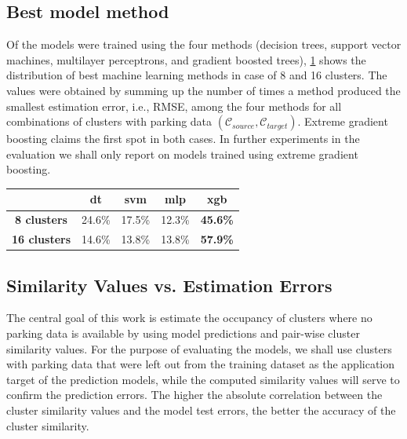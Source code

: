 	\subsection{Best model method}
	\label{sec:bestmodel}
	Of the models were trained using the four methods (decision trees, support vector machines, multilayer perceptrons, and gradient boosted trees), \cref{evaluation:best_model_method} shows the distribution of best machine learning methods in case of 8 and 16 clusters. The values were obtained by summing up the number of times a method produced the smallest estimation error, i.e., RMSE, among the four methods for all combinations of clusters with parking data $(\mathcal{C}_{source}, \mathcal{C}_{target})$.
	Extreme gradient boosting claims the first spot in both cases.
	In further experiments in the evaluation we shall only report on models trained using extreme gradient boosting.
	
	\begin{table}[!ht]
		{\begin{tabular}{ | c | c | c | c | c |}
				\hline
				& \textbf{dt} & \textbf{svm} & \textbf{mlp} & \textbf{xgb} \\ \hline
				\textbf{8 clusters} & 24.6\% & 17.5\% & 12.3\% & \textbf{45.6\%} \\ \hline
				\textbf{16 clusters} & 14.6\% & 13.8\% & 13.8\% & \textbf{57.9\%} \\ \hline
			\end{tabular}}
			\label{evaluation:best_model_method}
	\end{table}
		
	\subsection{Similarity Values vs. Estimation Errors}
	The central goal of this work is estimate the occupancy of clusters where no parking data is available by using model predictions and pair-wise cluster similarity values. For the purpose of evaluating the models, we shall use clusters with parking data that were left out from the training dataset as the application target of the prediction models, while the computed similarity values will serve to confirm the prediction errors. The higher the absolute correlation between the cluster similarity values and the model test errors, the better the accuracy of the cluster similarity. 
	
